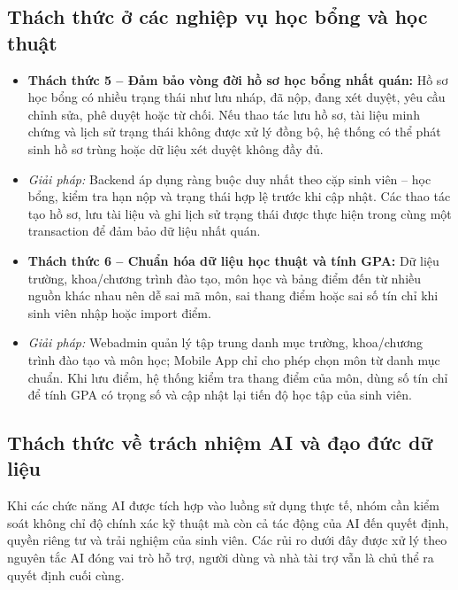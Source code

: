\subsection{Thách thức ở các nghiệp vụ học bổng và học thuật}
\begin{itemize}
    \item \textbf{Thách thức 5 -- Đảm bảo vòng đời hồ sơ học bổng nhất quán:} Hồ sơ học bổng có nhiều trạng thái như lưu nháp, đã nộp, đang xét duyệt, yêu cầu chỉnh sửa, phê duyệt hoặc từ chối. Nếu thao tác lưu hồ sơ, tài liệu minh chứng và lịch sử trạng thái không được xử lý đồng bộ, hệ thống có thể phát sinh hồ sơ trùng hoặc dữ liệu xét duyệt không đầy đủ.
    \item \textit{Giải pháp:} Backend áp dụng ràng buộc duy nhất theo cặp sinh viên -- học bổng, kiểm tra hạn nộp và trạng thái hợp lệ trước khi cập nhật. Các thao tác tạo hồ sơ, lưu tài liệu và ghi lịch sử trạng thái được thực hiện trong cùng một transaction để đảm bảo dữ liệu nhất quán.
    \item \textbf{Thách thức 6 -- Chuẩn hóa dữ liệu học thuật và tính GPA:} Dữ liệu trường, khoa/chương trình đào tạo, môn học và bảng điểm đến từ nhiều nguồn khác nhau nên dễ sai mã môn, sai thang điểm hoặc sai số tín chỉ khi sinh viên nhập hoặc import điểm.
    \item \textit{Giải pháp:} Webadmin quản lý tập trung danh mục trường, khoa/chương trình đào tạo và môn học; Mobile App chỉ cho phép chọn môn từ danh mục chuẩn. Khi lưu điểm, hệ thống kiểm tra thang điểm của môn, dùng số tín chỉ để tính GPA có trọng số và cập nhật lại tiến độ học tập của sinh viên.
\end{itemize}

\subsection{Thách thức về trách nhiệm AI và đạo đức dữ liệu}
Khi các chức năng AI được tích hợp vào luồng sử dụng thực tế, nhóm cần kiểm soát không chỉ độ chính xác kỹ thuật mà còn cả tác động của AI đến quyết định, quyền riêng tư và trải nghiệm của sinh viên. Các rủi ro dưới đây được xử lý theo nguyên tắc AI đóng vai trò hỗ trợ, người dùng và nhà tài trợ vẫn là chủ thể ra quyết định cuối cùng.


